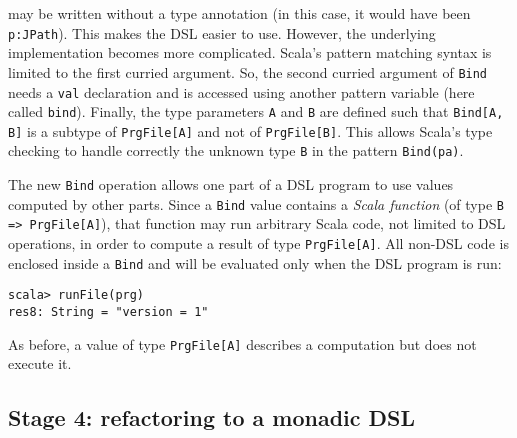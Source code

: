 may be written without a type annotation (in this case, it would have
been \lstinline!p:JPath!).
This makes the DSL easier to use. However, the underlying implementation
becomes more complicated. Scala\textsf{'}s pattern matching syntax is limited
to the first curried argument. So, the second curried argument of
\lstinline!Bind! needs
a \lstinline!val! declaration
and is accessed using another pattern variable (here called \lstinline!bind!).
Finally, the type parameters \lstinline!A!
and \lstinline!B! are defined
such that \lstinline!Bind[A, B]!
is a subtype of \lstinline!PrgFile[A]!
and not of \lstinline!PrgFile[B]!.
This allows Scala\textsf{'}s type checking to handle correctly the unknown
type \lstinline!B! in the
pattern \lstinline!Bind(pa)!.

The new \lstinline!Bind!
operation allows one part of a DSL program to use values computed
by other parts. Since a \lstinline!Bind!
value contains a \emph{Scala function} (of type \lstinline!B => PrgFile[A]!),
that function may run arbitrary Scala code, not limited to DSL operations,
in order to compute a result of type \lstinline!PrgFile[A]!.
All non-DSL code is enclosed inside a \lstinline!Bind!
and will be evaluated only when the DSL program is run:
\begin{lstlisting}
scala> runFile(prg)
res8: String = "version = 1"
\end{lstlisting}
 As before, a value of type \lstinline!PrgFile[A]!
describes a computation but does not execute it.

\subsection{Stage 4: refactoring to a monadic DSL}

